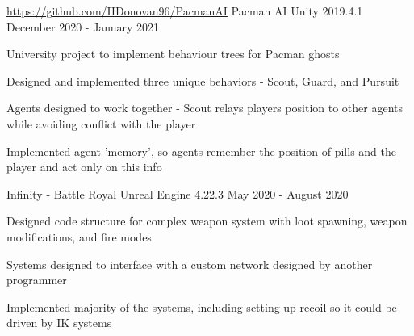 

\begin{cventries}
    \cventry
    {\href{https://github.com/HDonovan96/PacmanAI}{https://github.com/HDonovan96/PacmanAI}}
    {Pacman AI}
    {Unity 2019.4.1}
    {December 2020 - January 2021}
    {
        \begin{cvitems}
            \item University project to implement behaviour trees for Pacman ghosts
            \item Designed and implemented three unique behaviors - Scout, Guard, and Pursuit
            \item Agents designed to work together - Scout relays players position to other agents while avoiding conflict with the player
            \item Implemented agent 'memory', so agents remember the position of pills and the player and act only on this info
        \end{cvitems}
    }

    \cventry
    {}
    {Infinity - Battle Royal}
    {Unreal Engine 4.22.3}
    {May 2020 - August 2020}
    {
        \begin{cvitems}
            \item Designed code structure for complex weapon system with loot spawning, weapon modifications, and fire modes
            \item Systems designed to interface with a custom network designed by another programmer
            \item Implemented majority of the systems, including setting up recoil so it could be driven by IK systems
        \end{cvitems}
    }



\end{cventries}
